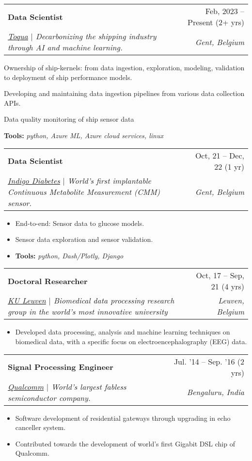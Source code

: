 \documentclass[letterpaper,11pt]{article}
\makeatletter
\newcommand{\resumeItem}[1]{
  \item\small{
    {#1 \vspace{-2pt}}
  }
}
\newcommand{\resumeSubheading}[4]{
  \vspace{-2pt}\item
    \begin{tabular*}{0.97\textwidth}[t]{l@{\extracolsep{\fill}}r}
      \textbf{#1} & #2 \\
      \textit{\small#3} & \textit{\small #4} \\
    \end{tabular*}\vspace{-7pt}
}
\newcommand{\resumeSubSubheading}[2]{
    \item
    \begin{tabular*}{0.97\textwidth}{l@{\extracolsep{\fill}}r}
      \textit{\small#1} & \textit{\small #2} \\
    \end{tabular*}\vspace{-7pt}
}
\newcommand{\resumeSubHeadingListEnd}{\end{itemize}}
\newcommand{\resumeItemListStart}{\begin{itemize}}
\newcommand{\resumeItemListEnd}{\end{itemize}\vspace{-5pt}}
\makeatother
\begin{document}
    \resumeSubheading
      {Data Scientist}{Feb, 2023 -- Present (2+ yrs)}
      {\href{https://toqua.ai}{\underline{Toqua}} $|$ \emph{Decarbonizing the shipping industry through AI and machine learning.}}{Gent, Belgium} 
      \resumeItemListStart
        \resumeItem{Ownership of ship-kernels: from data ingestion, exploration, modeling, validation to deployment of ship performance models. 
        \resumeItem{Developing and maintaining data ingestion pipelines from various data collection APIs.}
        \resumeItem{Data quality monitoring of ship sensor data}
        \resumeItem{\textbf{Tools:} \emph{python, Azure ML, Azure cloud services, linux}}}
      \resumeItemListEnd

    \resumeSubheading
      {Data Scientist}{Oct, 21 -- Dec, 22 (1 yr)}
      {\href{https://indigomed.com/}{\underline{Indigo Diabetes}} $|$ \emph{World’s first implantable Continuous Metabolite Measurement (CMM) sensor.}}
      {Gent, Belgium}
      \resumeItemListStart
        \resumeItem{End-to-end: Sensor data to glucose models.}
        \resumeItem{Sensor data exploration and sensor validation.}
        \resumeItem{\textbf{Tools:} \emph{python, Dash/Plotly, Django}}
      \resumeItemListEnd

    \resumeSubheading
      {Doctoral Researcher}{Oct, 17 -- Sep, 21 (4 yrs)}
      {\href{https://www.kuleuven.be/}{\underline{KU Leuven}} $|$ \emph{Biomedical data processing research group in the world’s most innovative university}}{Leuven, Belgium}
      \resumeItemListStart
        \resumeItem{Developed data processing, analysis and machine learning techniques on biomedical data, with a specific focus on electroencephalography (EEG) data.}
      \resumeItemListEnd
    
   \resumeSubheading
      {Signal Processing Engineer}{Jul. '14 -- Sep. '16 (2 yrs)}
      {\href{https://www.qualcomm.com/}{\underline{Qualcomm}} $|$ \emph{World’s largest fabless semiconductor company.}}
      {Bengaluru, India}
      \resumeItemListStart
        \resumeItem{Software development of residential gateways through upgrading in echo canceller system.}
        \resumeItem{Contributed towards the development of world’s first Gigabit DSL chip of Qualcomm.}
      \resumeItemListEnd
      
\end{document}
